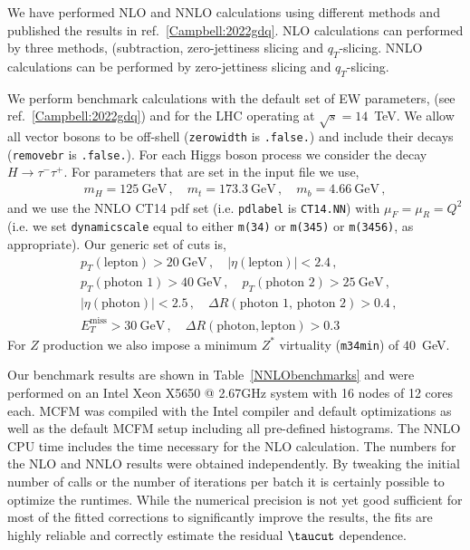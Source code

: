 We have performed NLO and NNLO calculations using different methods and published the results in ref.~\ref{Campbell:2022gdq}.
NLO calculations can performed by three methods, (subtraction, zero-jettiness slicing and $q_T$-slicing.
NNLO calculations can be performed by zero-jettiness slicing and $q_T$-slicing.

\label{sec:NNLO}
\label{sec:benchmark}
We perform benchmark calculations with the default set of EW parameters, (see ref.~\ref{Campbell:2022gdq})
and for the LHC operating at $\sqrt s = 14$~TeV.  We allow all
vector bosons to be off-shell ({\tt zerowidth} is {\tt .false.})
and include their decays ({\tt removebr} is {\tt .false.}).
For each Higgs boson process we consider the decay $H \to \tau^- \tau^+$.
For parameters that are set in the input file we use,
\begin{eqnarray}
m_H = 125~\mbox{GeV} \,, \quad
m_t = 173.3~\mbox{GeV} \,, \quad 
m_b = 4.66~\mbox{GeV} \,, 
\end{eqnarray}
and we use the NNLO CT14 pdf set (i.e. {\tt pdlabel} is {\tt CT14.NN}) with
$\mu_F = \mu_R = Q^2$ (i.e. we set {\tt dynamicscale} equal to
either {\tt m(34)} or {\tt m(345)} or {\tt m(3456)}, as appropriate).
Our generic set of cuts is,
\begin{eqnarray}
&& p_T(\mbox{lepton}) > 20~\mbox{GeV} \,, \quad
|\eta(\mbox{lepton})| < 2.4 \,, \quad \nonumber \\
&& p_T(\mbox{photon 1}) > 40~\mbox{GeV} \,, \quad
   p_T(\mbox{photon 2}) > 25~\mbox{GeV} \,, \quad \nonumber \\
&&|\eta(\mbox{photon})| < 2.5 \,, \quad 
\Delta R(\mbox{photon 1, photon 2}) > 0.4 \,, \quad \nonumber \\
&& E_T^{\mbox{miss}} > 30~\mbox{GeV} \,, \quad \Delta R(\text{photon}, \text{lepton}) > 0.3 \quad
\end{eqnarray}
For $Z$ production we also impose a minimum $Z^*$ virtuality ({\tt m34min})
of $40$~GeV.

Our benchmark results are shown in Table~\ref{NNLObenchmarks} and were performed on an Intel Xeon X5650 @ 2.67GHz
system with 16 nodes of 12 cores each. MCFM was compiled with the Intel compiler and default optimizations as well
as the default MCFM setup including all pre-defined histograms.  The NNLO CPU time includes the time necessary 
for the NLO calculation. The numbers for the NLO and NNLO results were obtained independently. By tweaking the 
initial number of calls or the number of iterations per batch it is 
certainly possible to optimize the runtimes. While the numerical precision is not yet good sufficient for most of the 
fitted corrections to significantly improve the results, the fits are highly reliable and correctly estimate the 
residual $\taucut$ dependence.


